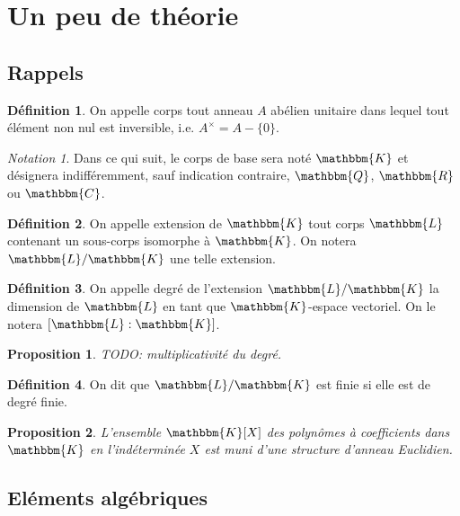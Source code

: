 \documentclass[12pt]{article}
\newcommand{\jL}{\mathbbm{L}}
\newcommand{\Q}{\mathbbm{Q}}
\newcommand{\R}{\mathbbm{R}}
\newcommand{\C}{\mathbbm{C}}
\newcommand{\K}{\mathbbm{K}}
\newtheorem{prop}{Proposition}
\theoremstyle{definition}\newtheorem{defn}{Définition}
\theoremstyle{definition}\newtheorem{exm}{Exemple}
\theoremstyle{definition}\newtheorem{rem}{Remarque}
\theoremstyle{definition}\newtheorem{algo}{Algorithme}
\theoremstyle{remark}\newtheorem{exo}{Exercice}
\theoremstyle{remark}\newtheorem{nota}{Notation}
\begin{document}
\vfill \eject


\pagebreak 

\section{Un peu de théorie}


\subsection{Rappels}

\begin{defn}
On appelle corps tout anneau $A$ abélien unitaire dans lequel tout élément non nul est inversible, i.e. $A^{\times} = A  - \{0\}$.
\end{defn}

\begin{nota}
Dans ce qui suit, le corps de base sera noté $\K$ et désignera indifféremment, sauf indication contraire, $\Q$, $\R$ ou $\C$. 
\end{nota}

\begin{defn}
On appelle extension de $\K$ tout corps $\jL$ contenant un sous-corps isomorphe à $\K$. On notera $\jL / \K$ une telle extension.
\end{defn}

\begin{defn}
On appelle degré de l'extension $\jL / \K$ la dimension de $\jL$ en tant que $\K$-espace vectoriel. On le notera $[\jL : \K]$.
\end{defn}

\begin{prop}
TODO: multiplicativité du degré.
\end{prop}

\begin{defn}
On dit que $\jL / \K$ est finie si elle est de degré finie.
\end{defn}

\begin{prop}
L'ensemble $\K[X]$ des polynômes à coefficients dans $\K$ en l'indéterminée $X$ est muni d'une structure d'anneau Euclidien.
\end{prop}


\subsection{Eléments algébriques}
\end{document}

